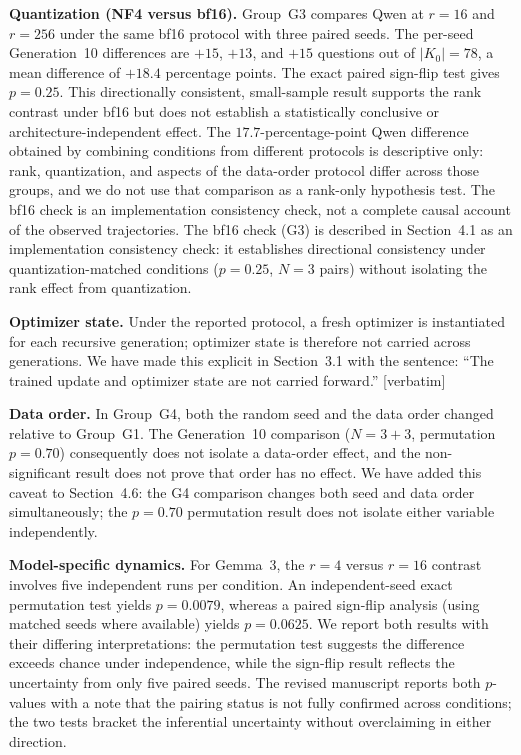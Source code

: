 \documentclass[11pt,a4paper]{article}
\newcommand{\newtext}[1]{\textcolor{chgcolor}{``#1''}}
\begin{document}
\textbf{Quantization (NF4 versus bf16).}
Group~G3 compares Qwen at $r=16$ and $r=256$ under the same bf16 protocol
with three paired seeds. The per-seed Generation~10 differences are $+15$,
$+13$, and $+15$ questions out of $|K_0|=78$, a mean difference of
$+18.4$ percentage points. The exact paired sign-flip test gives $p=0.25$.
This directionally consistent, small-sample result supports the rank
contrast under bf16 but does not establish a statistically conclusive or
architecture-independent effect. The $17.7$-percentage-point Qwen
difference obtained by combining conditions from different protocols is
descriptive only: rank, quantization, and aspects of the data-order
protocol differ across those groups, and we do not use that comparison as
a rank-only hypothesis test. The bf16 check is an implementation
consistency check, not a complete causal account of the observed
trajectories. The bf16 check (G3) is described in Section~4.1 as an
implementation consistency check: it establishes directional consistency
under quantization-matched conditions ($p=0.25$, $N=3$ pairs) without
isolating the rank effect from quantization.

\textbf{Optimizer state.}
Under the reported protocol, a fresh optimizer is instantiated for each
recursive generation; optimizer state is therefore not carried across
generations. We have made this explicit in Section~3.1 with the sentence:
\newtext{The trained update and optimizer state are not carried forward.} [verbatim]

\textbf{Data order.}
In Group~G4, both the random seed and the data order changed relative
to Group~G1. The Generation~10 comparison ($N=3+3$, permutation
$p=0.70$) consequently does not isolate a data-order effect, and the
non-significant result does not prove that order has no effect. We have
added this caveat to Section~4.6: the G4 comparison changes both seed
and data order simultaneously; the $p=0.70$ permutation result does
not isolate either variable independently.

\textbf{Model-specific dynamics.}
For Gemma~3, the $r=4$ versus $r=16$ contrast involves five independent
runs per condition. An independent-seed exact permutation test yields
$p=0.0079$, whereas a paired sign-flip analysis (using matched seeds
where available) yields $p=0.0625$. We report both results with their
differing interpretations: the permutation test suggests the difference
exceeds chance under independence, while the sign-flip result reflects
the uncertainty from only five paired seeds. The revised manuscript reports both $p$-values with a note
that the pairing status is not fully confirmed across conditions;
the two tests bracket the inferential uncertainty without overclaiming
in either direction.
\end{document}

